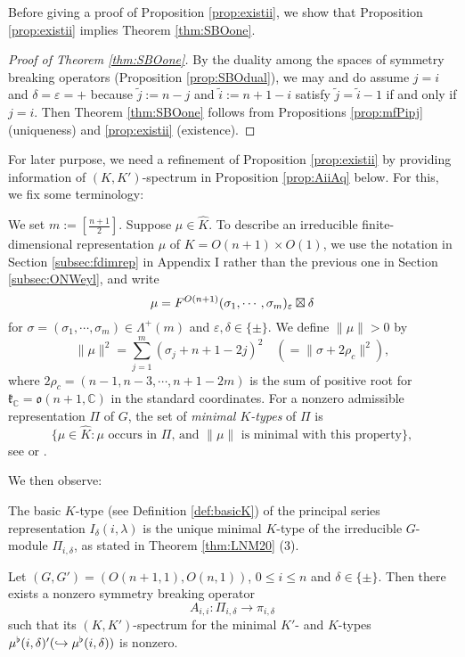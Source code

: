 Before giving a proof of Proposition \ref{prop:existii}, 
 we show
 that Proposition \ref{prop:existii} implies Theorem \ref{thm:SBOone}.  
\begin{proof}
[Proof of Theorem \ref{thm:SBOone}]
By the duality among the spaces
 of symmetry breaking operators
 (Proposition \ref{prop:SBOdual}), 
 we may and do assume $j=i$ and $\delta=\varepsilon=+$
 because $\widetilde j:=n-j$
 and $\widetilde i:=n+1-i$
 satisfy $\widetilde j = \widetilde i-1$
 if and only if $j=i$.  
Then Theorem \ref{thm:SBOone} follows from Propositions \ref{prop:mfPipj}
 (uniqueness) and \ref{prop:existii} (existence).  
\end{proof}
For later purpose,
 we need a refinement of Proposition \ref{prop:existii}
 by providing information of $(K,K')$-spectrum
 in Proposition \ref{prop:AiiAq} below.  
For this,
 we fix some terminology:
\begin{definition}
\label{def:minK}
We set $m:=[\frac{n+1}2]$.  
Suppose $\mu \in \widehat K$.  
To describe an irreducible finite-dimensional representation $\mu$
 of $K=O(n+1) \times O(1)$, 
 we use the notation in Section \ref{subsec:fdimrep}
 in Appendix I
 rather than the previous one
 in Section \ref{subsec:ONWeyl}, 
 and write
\[
  \mu = F^{{O(n+1)}}({\sigma_1, \cdots,\sigma_m})_{\varepsilon} \boxtimes \delta
\]
for $\sigma =(\sigma_1, \cdots,\sigma_m) \in \Lambda^+(m)$
 and $\varepsilon,\delta \in \{\pm\}$.  
We define $\|\mu\|>0$ by 
\[
\|\mu\|^2 = \sum_{j=1}^m (\sigma_j + n + 1-2j)^2
\quad
(=\|\sigma + 2 \rho_c\|^2), 
\]
where $2 \rho_c =(n-1,n-3,\cdots,n+1-2m)$ is the sum
 of positive root
 for ${\mathfrak{k}}_{\mathbb{C}}={\mathfrak{o}}(n+1,{\mathbb{C}})$
 in the standard coordinates.  
For a nonzero admissible representation $\Pi$ of $G$, 
 the set of {\it{minimal $K$-types}} of $\Pi$ is 
\[
   \{\mu \in \widehat K
   :
   \text{$\mu$ occurs in $\Pi$, 
 and $\|\mu\|$ is minimal with this property}\}, 
\]
see \cite[Chap.~2]{KV}
 or \cite[Def.~5.4.18]{Vogan81}.  
\end{definition}

We then observe:
\begin{remark}
\label{rem:minK}
The basic $K$-type 
 (see Definition \ref{def:basicK}) of the principal series representation
 $I_{\delta}(i,\lambda)$
 is the unique minimal $K$-type
 of the irreducible $G$-module $\Pi_{i,\delta}$, 
 as stated in Theorem \ref{thm:LNM20} (3).  
\end{remark}
\begin{proposition}
\label{prop:AiiAq}
Let $(G,G')=(O(n+1,1),O(n,1))$, 
 $0 \le i \le n$
 and $\delta \in \{\pm\}$.  
Then there exists a nonzero symmetry breaking operator
\begin{equation}
\label{eqn:Pipi}
   A_{i,i} \colon \Pi_{i,\delta} \to \pi_{i,\delta}
\end{equation}
 such that its $(K,K')$-spectrum
 for the minimal $K'$- and $K$-types $\mu^{\flat} (i,\delta)' (\hookrightarrow \mu^{\flat}(i,\delta))$
 is nonzero.  
\end{proposition}

